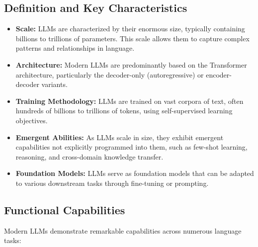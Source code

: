 \documentclass[11pt,a4paper]{report}
\begin{document}
\subsection{Definition and Key Characteristics}

\begin{itemize}
    \item \textbf{Scale:} LLMs are characterized by their enormous size, typically containing billions to trillions of parameters. This scale allows them to capture complex patterns and relationships in language.
    
    \item \textbf{Architecture:} Modern LLMs are predominantly based on the Transformer architecture, particularly the decoder-only (autoregressive) or encoder-decoder variants.
    
    \item \textbf{Training Methodology:} LLMs are trained on vast corpora of text, often hundreds of billions to trillions of tokens, using self-supervised learning objectives.
    
    \item \textbf{Emergent Abilities:} As LLMs scale in size, they exhibit emergent capabilities not explicitly programmed into them, such as few-shot learning, reasoning, and cross-domain knowledge transfer.
    
    \item \textbf{Foundation Models:} LLMs serve as foundation models that can be adapted to various downstream tasks through fine-tuning or prompting.
\end{itemize}

\subsection{Functional Capabilities}

Modern LLMs demonstrate remarkable capabilities across numerous language tasks:
\end{document}
